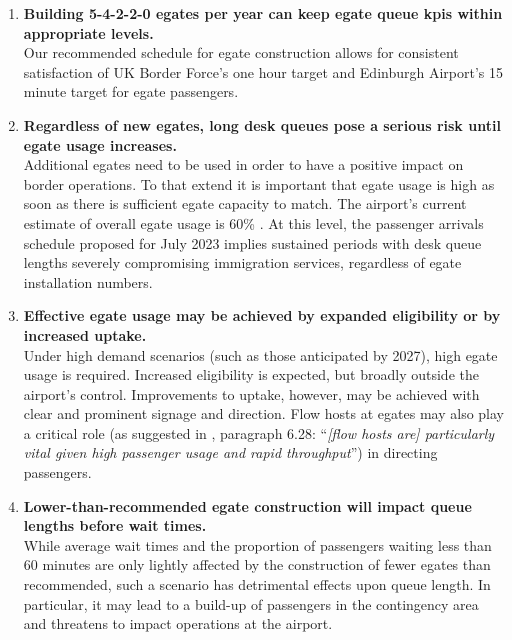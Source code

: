 \documentclass[10pt]{article}
\begin{document}
\vspace{4mm}
\begin{tcolorbox}[
colframe=edi-dark-purple,
colback=edi-light-purple,
fonttitle=\bfseries,
title = {Key Conclusions}]
\begin{enumerate}

    \item[\ding{40}] \textbf{Building 5-4-2-2-0 \glspl{egate} per year can keep \gls{egate} queue \glspl{kpi} within appropriate levels.}\\
    Our recommended schedule for \gls{egate} construction allows for consistent satisfaction of UK Border Force's one hour target and Edinburgh Airport's 15 minute target for \gls{egate} passengers.  \\ 
    \item[\ding{40}] \textbf{Regardless of new \glspl{egate}, long desk queues pose a serious risk until \gls{egate} usage increases.}\\
     Additional \glspl{egate} need to be used in order to have a positive impact on border operations. To that extend it is important that \gls{egate} usage is high as soon as there is sufficient \gls{egate} capacity to match. The airport's current estimate of overall \gls{egate} usage is 60\% \cite{modelling_competition}. At this level, the passenger arrivals schedule proposed for July 2023 implies sustained periods with desk queue lengths severely compromising immigration services, regardless of \gls{egate} installation numbers.\\
    
    \item[\ding{40}] \textbf{Effective \gls{egate} usage may be achieved by expanded eligibility or by increased uptake.}\\
    Under high demand scenarios (such as those anticipated by 2027), high \gls{egate} usage is required. Increased eligibility is expected, but broadly outside the airport's control. Improvements to uptake, however, may be achieved with clear and prominent signage and direction. Flow hosts at \glspl{egate} may also play a critical role (as suggested in \cite{Inspection_eGates}, paragraph 6.28: ``\textit{[flow hosts are] particularly vital given high passenger usage and rapid throughput}'') in directing passengers.\\
    
    \item[\ding{40}] \textbf{Lower-than-recommended \gls{egate} construction will impact queue lengths before wait times.}\\
    While average wait times and the proportion of passengers waiting less than 60 minutes are only lightly affected by the construction of fewer \glspl{egate} than recommended, such a scenario has detrimental effects upon queue length. In particular, it may lead to a build-up of passengers in the contingency area and threatens to impact operations at the airport.
\end{enumerate}
\end{tcolorbox}
\end{document}
